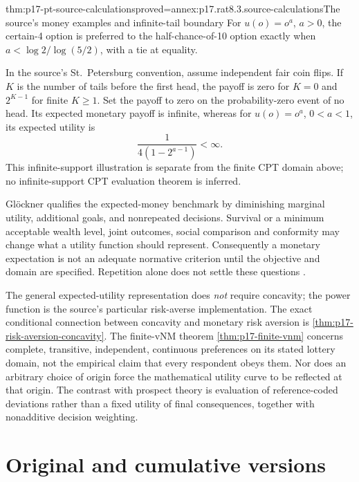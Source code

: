 \begin{hblemma}{thm:p17-pt-source-calculations}{proved=annex:p17.rat8.3.source-calculations}{The source's money examples and infinite-tail boundary}
For \(u(o)=o^a\), \(a>0\), the certain-4 option is preferred to
the half-chance-of-10 option exactly when
\(a<\log 2/\log(5/2)\), with a tie at equality.

In the source's St.~Petersburg convention, assume independent fair
coin flips. If \(K\) is the number of tails before the first head,
the payoff is zero for \(K=0\) and \(2^{K-1}\) for finite \(K\geq1\).
Set the payoff to zero on the probability-zero event of no head.
Its expected monetary payoff is infinite, whereas for
\(u(o)=o^a\), \(0<a<1\), its expected utility is
\[
                 \frac{1}{4(1-2^{a-1})}<\infty.
\]
This infinite-support illustration is separate from the finite CPT
domain above; no infinite-support CPT evaluation theorem is inferred.
\end{hblemma}

Gl\"ockner qualifies the expected-money benchmark by diminishing
marginal utility, additional goals, and nonrepeated decisions. Survival
or a minimum acceptable wealth level, joint outcomes, social comparison
and conformity may change what a utility function should represent.
Consequently a monetary expectation is not an adequate normative
criterion until the objective and domain are specified. Repetition
alone does not settle these questions
\cite[pp.~487--488, note~3]{Glockner2021ProspectTheory}.

The general expected-utility representation does \emph{not} require
concavity; the power function is the source's particular risk-averse
implementation. The exact conditional connection between concavity
and monetary risk aversion is
\cref{thm:p17-risk-aversion-concavity}. The finite-vNM theorem
\cref{thm:p17-finite-vnm} concerns complete, transitive, independent,
continuous preferences on its stated lottery domain, not the empirical
claim that every respondent obeys them. Nor does an arbitrary choice
of origin force the mathematical utility curve to be reflected at
that origin. The contrast with prospect theory is evaluation of
reference-coded deviations rather than a fixed utility of final
consequences, together with nonadditive decision weighting.

\section{Original and cumulative versions}


